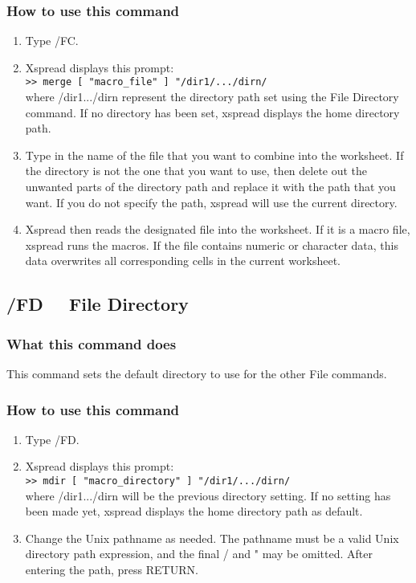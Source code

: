 \subsubsection*{How to use this command}
\begin{enumerate}
\item{Type /FC.}
\item{Xspread displays this prompt:\\
\verb|>> merge [ "macro_file" ] "/dir1/.../dirn/|   \\
        where /dir1.../dirn represent the directory path set using the
        File Directory command.  If no directory has been set, xspread
        displays the home directory path. }

\item{Type in the name of the file that you want to combine into the
        worksheet.  If the directory is not the one that you want to use,
        then delete out the unwanted parts
        of the directory path and replace it with the path that you want.
        If you do not specify the path, xspread will use the current
        directory.}
\item{Xspread then reads the designated file into the worksheet.  If it
        is a macro file, xspread runs the macros.  If the file contains
        numeric or character data, this data overwrites all corresponding
        cells in the current worksheet.}
\end{enumerate}


\subsection*{/FD \ \     File Directory}

\subsubsection*{What this command does}
This command sets the default directory to use for the other 
File commands.  

\subsubsection*{How to use this command}
\begin{enumerate}
\item{Type /FD.}
\item{Xspread displays this prompt:\\
	\verb|>> mdir [ "macro_directory" ] "/dir1/.../dirn/|\\
	where /dir1.../dirn will be the previous directory setting.  
	If no setting has been made yet, xspread displays the home
	directory path as default. }
\item{Change the Unix pathname as needed.  The pathname must be a valid
	Unix directory path expression, and the final / and " may be
	omitted.  After entering the path, press RETURN. }
\end{enumerate}
        
